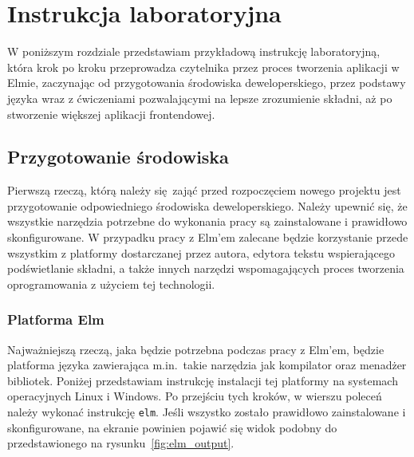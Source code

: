 \documentclass[twoside,a4paper]{report}
\begin{document}
\chapter{Instrukcja laboratoryjna}
W poniższym rozdziale przedstawiam przykładową instrukcję laboratoryjną, która krok po kroku przeprowadza czytelnika przez proces tworzenia aplikacji w Elmie, zaczynając od przygotowania środowiska deweloperskiego, przez podstawy języka wraz z ćwiczeniami pozwalającymi na lepsze zrozumienie składni, aż po stworzenie większej aplikacji frontendowej.

\section{Przygotowanie środowiska}
Pierwszą rzeczą, którą należy się zająć przed rozpoczęciem nowego projektu jest przygotowanie odpowiedniego środowiska deweloperskiego.
Należy upewnić się, że wszystkie narzędzia potrzebne do wykonania pracy są zainstalowane i prawidłowo skonfigurowane.
W przypadku pracy z Elm'em zalecane będzie korzystanie przede wszystkim z platformy dostarczanej przez autora, edytora tekstu wspierającego podświetlanie składni, a także innych narzędzi wspomagających proces tworzenia oprogramowania z użyciem tej technologii.

\subsection{Platforma Elm}
Najważniejszą rzeczą, jaka będzie potrzebna podczas pracy z Elm'em, będzie platforma języka zawierająca m.in.~takie narzędzia jak kompilator oraz menadżer bibliotek.
Poniżej przedstawiam instrukcję instalacji tej platformy na systemach operacyjnych Linux i Windows.
Po przejściu tych kroków, w wierszu poleceń należy wykonać instrukcję \texttt{elm}.
Jeśli wszystko zostało prawidłowo zainstalowane i skonfigurowane, na ekranie powinien pojawić się widok podobny do przedstawionego na rysunku~\ref{fig:elm_output}.
\end{document}
